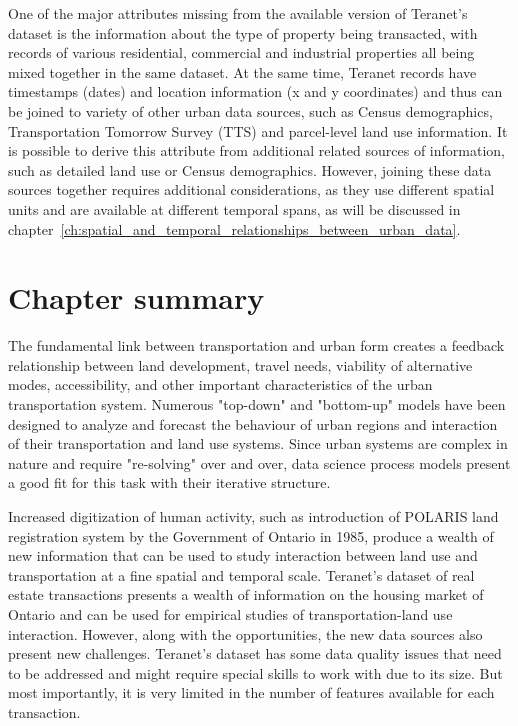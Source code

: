 One of the major attributes missing from the available version of Teranet's dataset is the information about the type of property being transacted, with records of various residential, commercial and industrial properties all being mixed together in the same dataset.
At the same time, Teranet records have timestamps (dates) and location information (x and y coordinates) and thus can be joined to variety of other urban data sources, such as Census demographics, Transportation Tomorrow Survey (TTS) and parcel-level land use information.
It is possible to derive this attribute from additional related sources of information, such as detailed land use or Census demographics.
However, joining these data sources together requires additional considerations, as they use different spatial units and are available at different temporal spans, as will be discussed in chapter~\ref{ch:spatial_and_temporal_relationships_between_urban_data}.


\section{Chapter summary} \label{sec:background_summary}

The fundamental link between transportation and urban form creates a feedback relationship between land development, travel needs, viability of alternative modes, accessibility, and other important characteristics of the urban transportation system.
Numerous "top-down" and "bottom-up" models have been designed to analyze and forecast the behaviour of urban regions and interaction of their transportation and land use systems.
Since urban systems are complex in nature and require "re-solving" over and over, data science process models present a good fit for this task with their iterative structure.

Increased digitization of human activity, such as introduction of POLARIS land registration system by the Government of Ontario in 1985, produce a wealth of new information that can be used to study interaction between land use and transportation at a fine spatial and temporal scale.
Teranet's dataset of real estate transactions presents a wealth of information on the housing market of Ontario and can be used for empirical studies of transportation-land use interaction.
However, along with the opportunities, the new data sources also present new challenges.
Teranet's dataset has some data quality issues that need to be addressed and might require special skills to work with due to its size.
But most importantly, it is very limited in the number of features available for each transaction.

